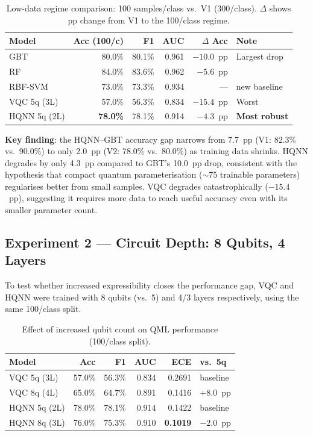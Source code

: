 \documentclass[journal]{IEEEtran}
\begin{document}
\begin{table}[H]
\centering
\caption{Low-data regime comparison: 100 samples/class vs.\ V1 (300/class).
         $\Delta$ shows pp change from V1 to the 100/class regime.}
\begin{tabular}{lrrrrl}
\toprule
\textbf{Model} & \textbf{Acc (100/c)} & \textbf{F1} & \textbf{AUC} & \textbf{$\Delta$ Acc} & \textbf{Note} \\
\midrule
GBT            & 80.0\% & 80.1\% & 0.961 & $-10.0$~pp & Largest drop \\
RF             & 84.0\% & 83.6\% & 0.962 & $-5.6$~pp  & \\
RBF-SVM        & 73.0\% & 73.3\% & 0.934 & —          & new baseline \\
VQC 5q (3L)   & 57.0\% & 56.3\% & 0.834 & $-15.4$~pp & Worst \\
HQNN 5q (2L)  & \textbf{78.0\%} & 78.1\% & 0.914 & $-4.3$~pp  & \textbf{Most robust} \\
\bottomrule
\end{tabular}
\end{table}

\noindent\textbf{Key finding}: the HQNN--GBT accuracy gap narrows from 7.7~pp
(V1: 82.3\% vs.\ 90.0\%) to only 2.0~pp (V2: 78.0\% vs.\ 80.0\%) as training
data shrinks. HQNN degrades by only 4.3~pp compared to GBT's 10.0~pp drop,
consistent with the hypothesis that compact quantum parameterisation
($\sim$75 trainable parameters) regularises better from small samples.
VQC degrades catastrophically ($-15.4$~pp), suggesting it requires more
data to reach useful accuracy even with its smaller parameter count.

\subsection{Experiment 2 — Circuit Depth: 8 Qubits, 4 Layers}

To test whether increased expressibility closes the performance gap,
VQC and HQNN were trained with 8 qubits (vs.\ 5) and 4/3 layers respectively,
using the same 100/class split.

\begin{table}[H]
\centering
\caption{Effect of increased qubit count on QML performance (100/class split).}
\begin{tabular}{lrrrrl}
\toprule
\textbf{Model} & \textbf{Acc} & \textbf{F1} & \textbf{AUC} & \textbf{ECE} & \textbf{vs.\ 5q} \\
\midrule
VQC 5q (3L)  & 57.0\% & 56.3\% & 0.834 & 0.2691 & baseline \\
VQC 8q (4L)  & 65.0\% & 64.7\% & 0.891 & 0.1416 & $+8.0$~pp \\
\midrule
HQNN 5q (2L) & 78.0\% & 78.1\% & 0.914 & 0.1422 & baseline \\
HQNN 8q (3L) & 76.0\% & 75.3\% & 0.910 & \textbf{0.1019} & $-2.0$~pp \\
\bottomrule
\end{tabular}
\end{table}
\end{document}
